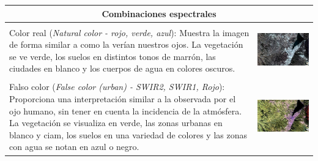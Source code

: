 \documentclass[a4paper,12pt]{book}
\begin{document}
\pagebreak
\hspace{0pt}
\vfill
\begin{table}[H]
    \begin{tabular}{m{} c}
        \toprule
        \multicolumn{2}{c}{Combinaciones espectrales}\\
        \midrule\\
        Color real (\emph{Natural color - rojo, verde, azul}): Muestra la imagen de forma similar a como la verían nuestros ojos. La vegetación se ve verde, los suelos en distintos tonos de marrón, las ciudades en blanco y los cuerpos de agua en colores oscuros. &
        \begin{minipage}{.4\textwidth} \includegraphics[width=\linewidth]{4-3-2.jpeg}
        \end{minipage}\\
        &\\
        Falso color (\emph{False color (urban) - SWIR2, SWIR1, Rojo}): Proporciona una interpretación similar a la observada por el ojo humano, sin tener en cuenta la incidencia de la atmósfera. La vegetación se visualiza en verde, las zonas urbanas en blanco y ciam, los suelos en una variedad de colores y las zonas con agua se notan en azul o negro. &
        \begin{minipage}{.4\textwidth} \includegraphics[width=\linewidth]{12-11-4.jpeg}

\end{minipage}
\end{tabular}
\end{table}
\end{document}
